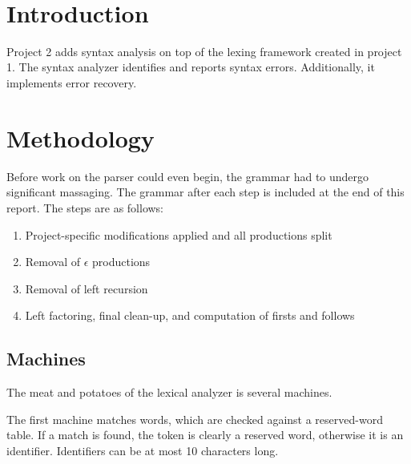 \documentclass[paper=letter, fontsize=11pt, oneside, titlepage]{scrartcl}
\title{
\vspace{1.8 in} \normalfont \normalsize 
\textsc{\pschool} \\ [25pt] %
\horrule{0.5pt} \\[0.4cm] %
\huge \ptitle \\ %
\horrule{0.5pt} \\[0.5cm] %
}
\author{\pauthor} %
\date{
    \normalsize
    \pteacher \endgraf
    \pclass \endgraf
    \pdate
} %
\begin{document}

\maketitle

\section{Introduction}\label{intro}

Project 2 adds syntax analysis on top of the lexing framework created in project 1.  The syntax analyzer identifies and reports syntax errors.  Additionally, it implements error recovery.  

\section{Methodology}\label{meth}

Before work on the parser could even begin, the grammar had to undergo significant massaging.  The grammar after each step is included at the end of this report.  The steps are as follows: 
\begin{enumerate}
  \item Project-specific modifications applied and all productions split
  \item Removal of $\epsilon$ productions
  \item Removal of left recursion
  \item Left factoring, final clean-up, and computation of firsts and follows
\end{enumerate}




\subsection{Machines}\label{machines}

The meat and potatoes of the lexical analyzer is several machines.

The first machine matches words, which are checked against a reserved-word table. If a match is found, the token is clearly a reserved word, otherwise it is an identifier.  Identifiers can be at most 10 characters long.
\end{document}
